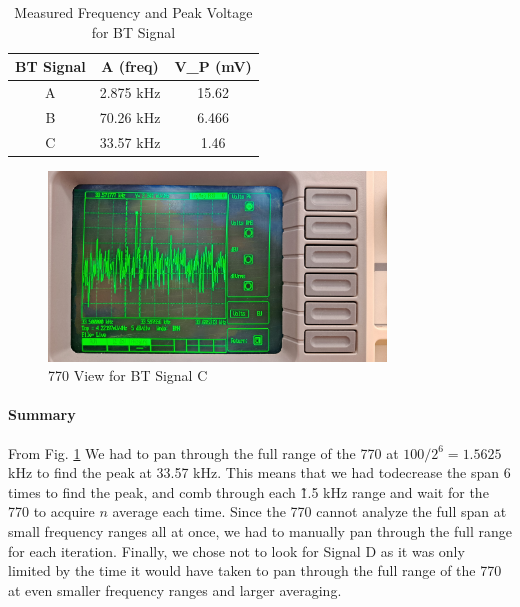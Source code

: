 \documentclass[../main.tex]{subfiles}
\begin{document}
\begin{table}[!ht]
    \centering
    \begin{tabular}{|c|c|c|}
    \hline
        BT Signal & A (freq) & V\_P (mV) \\ \hline
        A & 2.875 kHz & 15.62 \\ \hline
        B & 70.26 kHz & 6.466 \\ \hline
        C & 33.57 kHz & 1.46 \\ \hline
    \end{tabular}
    \caption{Measured Frequency and Peak Voltage for BT Signal}
    \label{tab:4}
\end{table}

\begin{figure}[!ht]
    \centering
    \includegraphics[width=0.8\textwidth]{fig1_12.jpg}
    \caption{770 View for BT Signal C}
    \label{fig:1.12}
\end{figure}

\paragraph*{Summary}
From Fig. \ref{fig:1.12} We had to pan through the full range of the 770 at $100 / 2^6 = 1.5625$ kHz to find the peak at 33.57 kHz.
This means that we had todecrease the span 6 times to find the peak, and comb through each \~1.5 kHz range and wait for the 770 to acquire $n$ average each time.
Since the 770 cannot analyze the full span at small frequency ranges all at once, we had to manually pan through the full range for each iteration. 
Finally, we chose not to look for Signal D as it was only limited by the time it would have taken to pan through the full range of the 770 at even
smaller frequency ranges and larger averaging.
\end{document}
